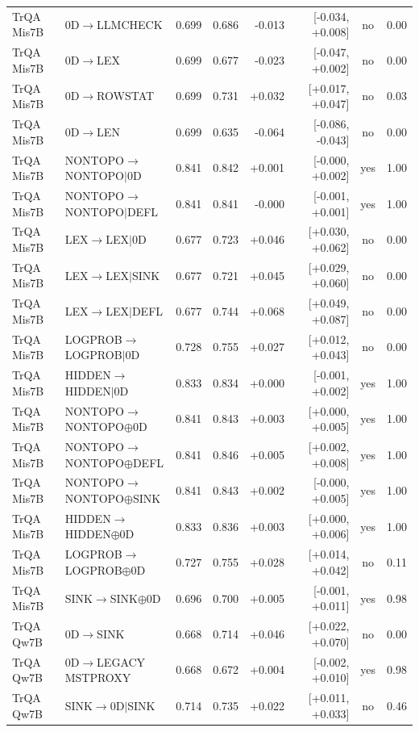 \begin{longtable}{llrrrrcc}
TrQA Mis7B & 0D$\to$LLMCHECK & 0.699 & 0.686 & -0.013 & [-0.034, +0.008] & no & 0.00 \\
TrQA Mis7B & 0D$\to$LEX & 0.699 & 0.677 & -0.023 & [-0.047, +0.002] & no & 0.00 \\
TrQA Mis7B & 0D$\to$ROWSTAT & 0.699 & 0.731 & +0.032 & [+0.017, +0.047] & no & 0.03 \\
TrQA Mis7B & 0D$\to$LEN & 0.699 & 0.635 & -0.064 & [-0.086, -0.043] & no & 0.00 \\
TrQA Mis7B & NONTOPO$\to$NONTOPO$\mid$0D & 0.841 & 0.842 & +0.001 & [-0.000, +0.002] & yes & 1.00 \\
TrQA Mis7B & NONTOPO$\to$NONTOPO$\mid$DEFL & 0.841 & 0.841 & -0.000 & [-0.001, +0.001] & yes & 1.00 \\
TrQA Mis7B & LEX$\to$LEX$\mid$0D & 0.677 & 0.723 & +0.046 & [+0.030, +0.062] & no & 0.00 \\
TrQA Mis7B & LEX$\to$LEX$\mid$SINK & 0.677 & 0.721 & +0.045 & [+0.029, +0.060] & no & 0.00 \\
TrQA Mis7B & LEX$\to$LEX$\mid$DEFL & 0.677 & 0.744 & +0.068 & [+0.049, +0.087] & no & 0.00 \\
TrQA Mis7B & LOGPROB$\to$LOGPROB$\mid$0D & 0.728 & 0.755 & +0.027 & [+0.012, +0.043] & no & 0.00 \\
TrQA Mis7B & HIDDEN$\to$HIDDEN$\mid$0D & 0.833 & 0.834 & +0.000 & [-0.001, +0.002] & yes & 1.00 \\
TrQA Mis7B & NONTOPO$\to$NONTOPO$\oplus$0D & 0.841 & 0.843 & +0.003 & [+0.000, +0.005] & yes & 1.00 \\
TrQA Mis7B & NONTOPO$\to$NONTOPO$\oplus$DEFL & 0.841 & 0.846 & +0.005 & [+0.002, +0.008] & yes & 1.00 \\
TrQA Mis7B & NONTOPO$\to$NONTOPO$\oplus$SINK & 0.841 & 0.843 & +0.002 & [-0.000, +0.005] & yes & 1.00 \\
TrQA Mis7B & HIDDEN$\to$HIDDEN$\oplus$0D & 0.833 & 0.836 & +0.003 & [+0.000, +0.006] & yes & 1.00 \\
TrQA Mis7B & LOGPROB$\to$LOGPROB$\oplus$0D & 0.727 & 0.755 & +0.028 & [+0.014, +0.042] & no & 0.11 \\
TrQA Mis7B & SINK$\to$SINK$\oplus$0D & 0.696 & 0.700 & +0.005 & [-0.001, +0.011] & yes & 0.98 \\
TrQA Qw7B & 0D$\to$SINK & 0.668 & 0.714 & +0.046 & [+0.022, +0.070] & no & 0.00 \\
TrQA Qw7B & 0D$\to$LEGACY MSTPROXY & 0.668 & 0.672 & +0.004 & [-0.002, +0.010] & yes & 0.98 \\
TrQA Qw7B & SINK$\to$0D$\mid$SINK & 0.714 & 0.735 & +0.022 & [+0.011, +0.033] & no & 0.46 \\

\end{longtable}
